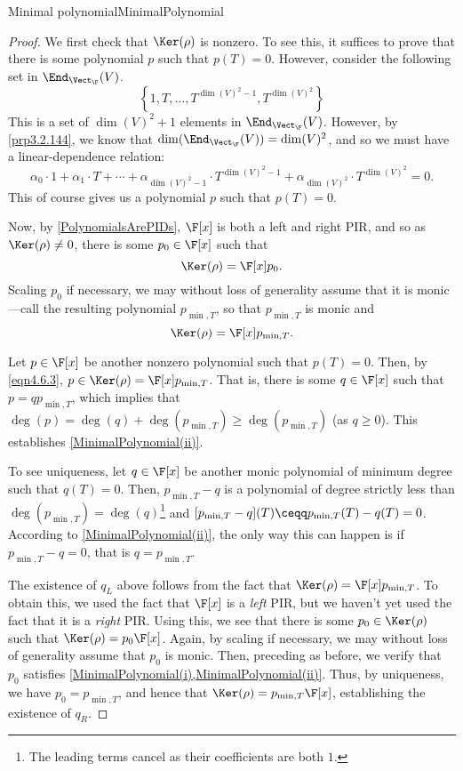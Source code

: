 \begin{thm}{Minimal polynomial}{MinimalPolynomial}
\begin{proof}
		We first check that $\Ker (\rho )$ is nonzero.  To see this, it suffices to prove that there is some polynomial $p$ such that $p(T)=0$.  However, consider the following set in $\End _{\Vect _{\F}}(V)$.
		\begin{equation}
			\left\{ 1,T,\ldots ,T^{\dim (V)^2-1},T^{\dim (V)^2}\right\}
		\end{equation}
		This is a set of $\dim (V)^2+1$ elements in $\End _{\Vect _{\F}}(V)$.  However, by \cref{prp3.2.144}, we know that $\dim (\End _{\Vect _{\F}}(V))=\dim (V)^2$, and so we must have a linear-dependence relation:
		\begin{equation}
			\alpha _0\cdot 1+\alpha _1\cdot T+\cdots +\alpha _{\dim (V)^2-1}\cdot T^{\dim (V)^2-1}+\alpha _{\dim (V)^2}\cdot T^{\dim (V)^2}=0.
		\end{equation}
		This of course gives us a polynomial $p$ such that $p(T)=0$.
		
		Now, by \cref{PolynomialsArePIDs}, $\F [x]$ is both a left and right PIR, and so as $\Ker (\rho )\neq 0$, there is some $p_0\in \F [x]$ such that
		\begin{equation}
			\Ker (\rho )=\F [x]p_0.
		\end{equation}
		Scaling $p_0$ if necessary, we may without loss of generality assume that it is monic---call the resulting polynomial $p_{\min ,T}$, so that $p_{\min ,T}$ is monic and
		\begin{equation}
			\Ker (\rho )=\F [x]p_{\min ,T}.
		\end{equation}
		
		Let $p\in \F [x]$ be another nonzero polynomial such that $p(T)=0$.  Then, by \eqref{eqn4.6.3}, $p\in \Ker (\rho )=\F [x]p_{\min ,T}$.  That is, there is some $q\in \F [x]$ such that $p=qp_{\min ,T}$, which implies that $\deg (p)=\deg (q)+\deg (p_{\min ,T})\geq \deg (p_{\min ,T})$ (as $q\geq 0$).  This establishes \cref{MinimalPolynomial(ii)}.
		
		To see uniqueness, let $q\in \F [x]$ be another monic polynomial of minimum degree such that $q(T)=0$.  Then, $p_{\min ,T}-q$ is a polynomial of degree strictly less than $\deg (p_{\min ,T})=\deg (q)$\footnote{The leading terms cancel as their coefficients are both $1$.} and $[p_{\min ,T}-q](T)\ceqq p_{\min ,T}(T)-q(T)=0$.  According to \cref{MinimalPolynomial(ii)}, the only way this can happen is if $p_{\min ,T}-q=0$, that is $q=p_{\min ,T}$.
		
		The existence of $q_L$ above follows from the fact that $\Ker (\rho )=\F [x]p_{\min ,T}$.  To obtain this, we used the fact that $\F [x]$ is a \emph{left} PIR, but we haven't yet used the fact that it is a \emph{right} PIR.  Using this, we see that there is some $p_0\in \Ker (\rho )$ such that $\Ker (\rho )=p_0\F [x]$.  Again, by scaling if necessary, we may without loss of generality assume that $p_0$ is monic.  Then, preceding as before, we verify that $p_0$ satisfies \cref{MinimalPolynomial(i),MinimalPolynomial(ii)}.  Thus, by uniqueness, we have $p_0=p_{\min ,T}$, and hence that $\Ker (\rho )=p_{\min ,T}\F [x]$, establishing the existence of $q_R$.
	\end{proof}
\end{thm}

